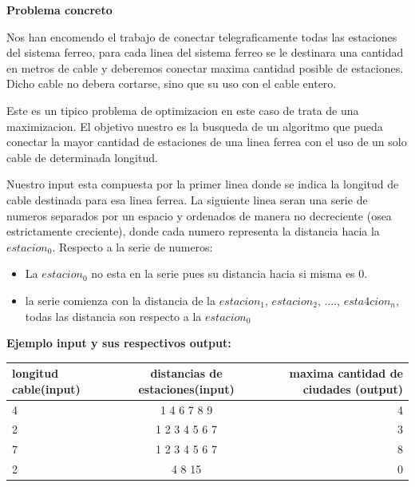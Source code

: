 \textbf{Problema concreto} \newline

Nos han encomendo el trabajo de conectar telegraficamente todas las estaciones del sistema ferreo,
para cada linea del sistema ferreo se le destinara una cantidad en metros de cable y deberemos conectar maxima cantidad posible de estaciones. Dicho cable no debera cortarse, sino que su uso con el cable entero.

Este es un tipico problema de optimizacion en este caso de trata de una maximizacion.
El objetivo nuestro es la busqueda de un algoritmo que pueda conectar la mayor cantidad de estaciones de una linea ferrea con el uso de un solo cable de determinada longitud.  

Nuestro input esta compuesta por la primer linea donde se indica la longitud de cable destinada para esa linea ferrea. La siguiente linea seran una serie 
de numeros separados por un espacio y ordenados de manera no decreciente (osea estrictamente creciente), donde cada numero representa la distancia hacia la $estacion_0$. 
Respecto a la serie de numeros:
\begin{itemize}
    \item La $estacion_0$ no esta en la serie pues su distancia hacia si misma es $0$.
    \item la serie comienza con la distancia de la $estacion_1$, $estacion_2$, ...., $esta4cion_n$, todas las distancia son respecto a la $estacion_0$ 
\end{itemize}

\textbf{Ejemplo input y sus respectivos output: } 

\begin{center}
   \begin{tabular}{ | l | c | r | }
     \hline
     longitud cable(input) & distancias de estaciones(input) & maxima cantidad de ciudades (output)\\ \hline
     4 & 1 4 6 7 8 9 & 4 \\ \hline
     2 & 1 2 3 4 5 6 7 & 3 \\ \hline
     7 & 1 2 3 4 5 6 7 & 8 \\ \hline
     2 & 4 8 15 & 0 \\
     \hline
   \end{tabular}
\end{center}



